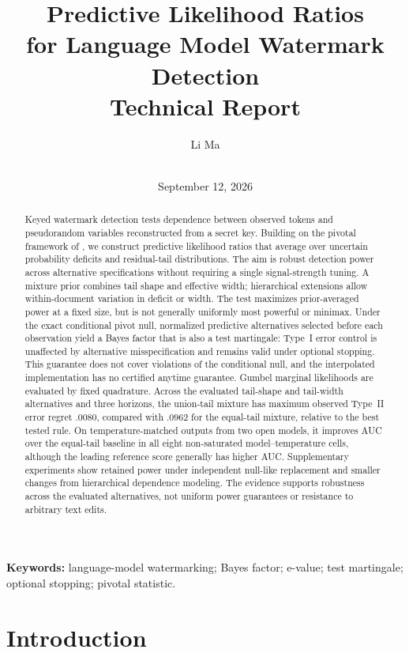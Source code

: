 \documentclass[11pt]{article}
\title{\textbf{Predictive Likelihood Ratios\\for Language Model Watermark Detection}\\[0.5em]
  {\large Technical Report}}
\author{Li Ma\\
  {\normalsize\AuthorAffiliation}\\
  {\small\href{mailto:\AuthorEmail}{\texttt{\AuthorEmail}}}}
\date{September 12, 2026}
\begin{document}
\maketitle

\begin{abstract}
Keyed watermark detection tests dependence between observed tokens and
pseudorandom variables reconstructed from a secret key.  Building on the pivotal
framework of \citet{li2025framework}, we construct predictive likelihood ratios
that average over uncertain probability deficits and residual-tail distributions.
The aim is robust detection power across alternative specifications without
requiring a single signal-strength tuning.  A mixture prior combines tail shape
and effective width; hierarchical extensions allow within-document variation in
deficit or width.  The test maximizes prior-averaged power at a fixed size, but
is not generally uniformly most powerful or minimax.  Under the exact conditional
pivot null, normalized predictive alternatives selected before each observation
yield a Bayes factor that is also a test martingale: Type~I error control is unaffected by alternative
misspecification and remains valid under optional stopping.  This guarantee
does not cover violations of the conditional null, and the interpolated
implementation has no certified anytime guarantee.  Gumbel marginal likelihoods
are evaluated by fixed quadrature.  Across the evaluated tail-shape and
tail-width alternatives and three horizons, the union-tail mixture has maximum
observed Type~II error regret $.0080$, compared with $.0962$ for the equal-tail
mixture, relative to the best tested rule.  On temperature-matched outputs from
two open models, it improves AUC over the equal-tail baseline in all eight
non-saturated model--temperature cells, although the leading reference score
generally has higher AUC.  Supplementary experiments show retained power under
independent null-like replacement and smaller changes from hierarchical dependence
modeling.  The evidence supports robustness across the evaluated alternatives,
not uniform power guarantees or resistance to arbitrary text edits.
\end{abstract}

\noindent\textbf{Keywords:} language-model watermarking; Bayes factor; e-value; test martingale; optional stopping; pivotal statistic.

\section{Introduction}
\end{document}
